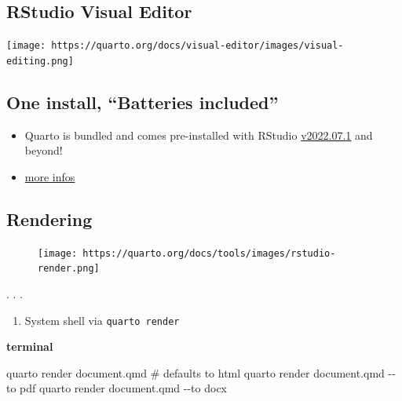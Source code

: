 \documentclass[
  letterpaper,
  DIV=11,
  numbers=noendperiod]{scrartcl}
\newenvironment{Shaded}{\begin{snugshade}}{\end{snugshade}}
\newcommand{\AttributeTok}[1]{\textcolor[rgb]{0.40,0.45,0.13}{#1}}
\newcommand{\CommentTok}[1]{\textcolor[rgb]{0.37,0.37,0.37}{#1}}
\newcommand{\ExtensionTok}[1]{\textcolor[rgb]{0.00,0.23,0.31}{#1}}
\newcommand{\NormalTok}[1]{\textcolor[rgb]{0.00,0.23,0.31}{#1}}
\providecommand{\tightlist}{%
  \setlength{\itemsep}{0pt}\setlength{\parskip}{0pt}}\usepackage{longtable,booktabs,array}
\begin{document}
\hypertarget{rstudio-visual-editor}{%
\subsection{RStudio Visual Editor}\label{rstudio-visual-editor}}

\texttt{[image: https://quarto.org/docs/visual-editor/images/visual-editing.png]}

\hypertarget{one-install-batteries-included}{%
\subsection{One install, ``Batteries
included''}\label{one-install-batteries-included}}

\begin{itemize}
\item
  Quarto is bundled and comes pre-installed with RStudio
  \href{https://www.rstudio.com/products/rstudio/download/\#download}{v2022.07.1}
  and beyond!
\item
  \href{https://quarto.org/docs/computations/r.html\#chunk-options}{more
  infos}
\end{itemize}

\hypertarget{rendering}{%
\subsection{Rendering}\label{rendering}}

\begin{figure}

{\centering \texttt{[image: https://quarto.org/docs/tools/images/rstudio-render.png]}

}

\end{figure}

. . .

\begin{enumerate}
\def\labelenumi{\arabic{enumi}.}
\setcounter{enumi}{1}
\tightlist
\item
  System shell via \texttt{quarto\ render}
\end{enumerate}

\textbf{terminal}

\begin{Shaded}
\begin{Highlighting}[]
\ExtensionTok{quarto}\NormalTok{ render document.qmd }\CommentTok{\# defaults to html}
\ExtensionTok{quarto}\NormalTok{ render document.qmd }\AttributeTok{{-}{-}to}\NormalTok{ pdf}
\ExtensionTok{quarto}\NormalTok{ render document.qmd }\AttributeTok{{-}{-}to}\NormalTok{ docx}
\end{Highlighting}
\end{Shaded}
\end{document}
